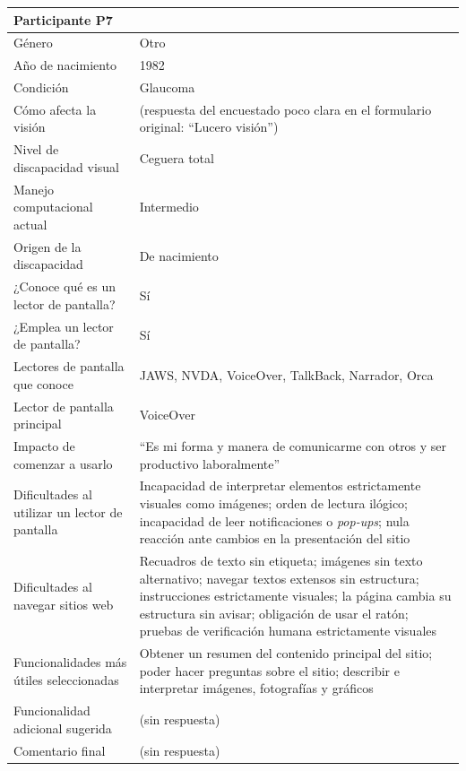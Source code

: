\begin{longtable}{|p{4cm}|p{10.5cm}|}
    \multicolumn{2}{|l|}{\textbf{Participante P7}} \\
    \hline
    Género & Otro \\
    \hline
    Año de nacimiento & 1982 \\
    \hline
    Condición & Glaucoma \\
    \hline
    Cómo afecta la visión & (respuesta del encuestado poco clara en el formulario original: ``Lucero visión'') \\
    \hline
    Nivel de discapacidad visual & Ceguera total \\
    \hline
    Manejo computacional actual & Intermedio \\
    \hline
    Origen de la discapacidad & De nacimiento \\
    \hline
    ¿Conoce qué es un lector de pantalla? & Sí \\
    \hline
    ¿Emplea un lector de pantalla? & Sí \\
    \hline
    Lectores de pantalla que conoce & JAWS, NVDA, VoiceOver, TalkBack, Narrador, Orca \\
    \hline
    Lector de pantalla principal & VoiceOver \\
    \hline
    Impacto de comenzar a usarlo & ``Es mi forma y manera de comunicarme con otros y ser productivo laboralmente'' \\
    \hline
    Dificultades al utilizar un lector de pantalla & Incapacidad de interpretar elementos estrictamente visuales como imágenes; orden de lectura ilógico; incapacidad de leer notificaciones o \textit{pop-ups}; nula reacción ante cambios en la presentación del sitio \\
    \hline
    Dificultades al navegar sitios web & Recuadros de texto sin etiqueta; imágenes sin texto alternativo; navegar textos extensos sin estructura; instrucciones estrictamente visuales; la página cambia su estructura sin avisar; obligación de usar el ratón; pruebas de verificación humana estrictamente visuales \\
    \hline
    Funcionalidades más útiles seleccionadas & Obtener un resumen del contenido principal del sitio; poder hacer preguntas sobre el sitio; describir e interpretar imágenes, fotografías y gráficos \\
    \hline
    Funcionalidad adicional sugerida & (sin respuesta) \\
    \hline
    Comentario final & (sin respuesta) \\
    \hline


\end{longtable}
